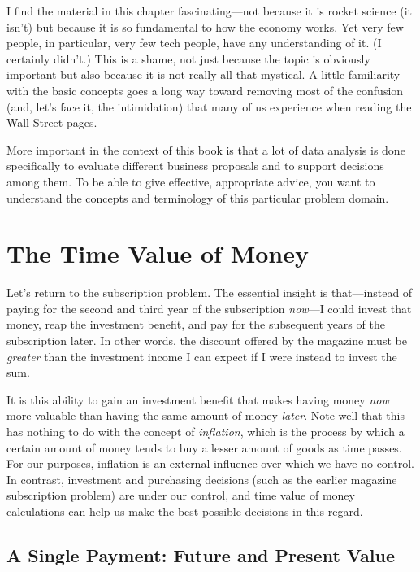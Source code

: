 I find the material in this chapter fascinating---not because it is
rocket science (it isn't) but because it is so fundamental to how the
economy works. Yet very few people, in particular, very few tech
people, have any understanding of it. (I certainly didn't.) This is a
shame, not just because the topic is obviously important but also
because it is not really all that mystical. A little familiarity with
the basic concepts goes a long way toward removing most of the
confusion (and, let's face it, the intimidation) that many of us
experience when reading the Wall Street pages.

More important in the context of this book is that a lot of data
analysis is done specifically to evaluate different business proposals
and to support decisions among them. To be able to give effective,
appropriate advice, you want to understand the concepts and
terminology of this particular problem domain.

\section{The Time Value of Money}

 
Let's return to the subscription problem. The essential insight is
that---instead of paying for the second and third year of the
subscription \emph{now}---I could invest that money, reap the
investment benefit, and pay for the subsequent years of the
subscription later. In other words, the discount offered by the
magazine must be \emph{greater} than the investment income I can
expect if I were instead to invest the sum.
    
It is this ability to gain an investment benefit that makes having
money \emph{now} more valuable than having the same amount of money
\emph{later}. Note well that this has nothing to do with the concept
of \emph{inflation}, which is the process by which a certain amount of
money tends to buy a lesser amount of goods as time passes. For our
purposes, inflation is an external influence over which we have no
control. In contrast, investment and purchasing decisions (such as the
earlier magazine subscription problem) are under our control, and time
value of money calculations can help us make the best possible
decisions in this regard.

\subsection{A Single Payment: Future and Present Value}
 
